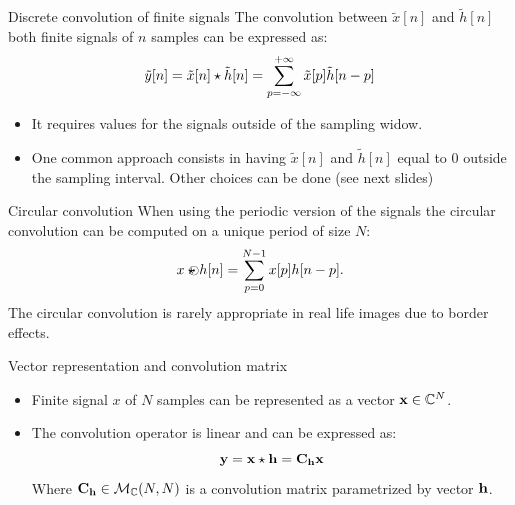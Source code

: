 \begin{block}{Discrete convolution of finite signals}
  The convolution between $\tilde x[n]$ and $\tilde h[n]$ both finite signals of $n$ samples can be expressed as:
  \begin{equation}
      \tilde y[n]=\tilde x[n]\star\tilde h[n] =  \sum_{p=-\infty}^{+\infty}
      \tilde x[p] \tilde h[n-p] 
      \label{eq:conv_finite}\vspace{-3mm}
  \end{equation}
  \begin{itemize}
      \item It requires values for the signals outside of the sampling widow. 
      \item One common approach consists in having $\tilde x[n]$ and $\tilde h[n]$ equal to $0$ outside the sampling interval. Other choices can be done (see next slides)
  \end{itemize}
\end{block}

\begin{block}{Circular convolution}
  When using the periodic version of the signals the circular convolution can be computed on a unique period of size $N$:
  \[
      x {\mbox{$\;\odot \!\!\!\!\!\star~$}} h [n] 
      = \sum_{p=0}^{N-1}
      x[p] h[n-p] .
      \] 
The circular convolution is rarely appropriate in real life images due to border effects.
\end{block}

\begin{block}{Vector representation and convolution
matrix}\vspace{-2mm}
  \begin{itemize}
      \item Finite signal $x$ of $N$ samples can be represented as a vector $\mathbf{x}\in\mathbb{C}^N$.
      \item The convolution operator is linear and can be expressed as:\vspace{-1mm}
      $$ \mathbf{y}=\mathbf{x}\star\mathbf{h}= \mathbf{C}_{\mathbf{h}} \mathbf{x} $$
      Where\vspace{-1mm} $\mathbf{C}_{\mathbf{h}}\in \mathcal{M}_\mathbb{C}(N,N)$ is a convolution matrix parametrized by vector $\mathbf{h}$.
  \end{itemize} \vspace{-4mm}
\end{block} %

